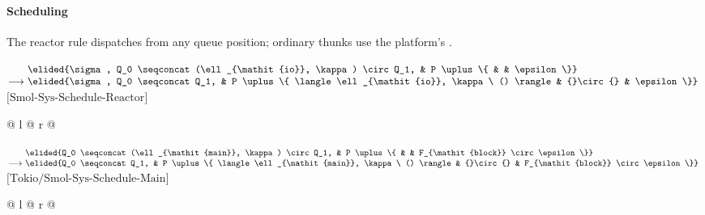 \paragraph{Scheduling}
The reactor rule dispatches from any queue position; ordinary thunks use the platform's  .

\noindent
$\begin{array}[t]{@{}r@{\ }l@{\ }l@{}l@{}l@{}}
                & \elided{\sigma, Q_0 \seqconcat (\ell_{\mathit{io}}, \kappa) \circ Q_1, & P \uplus \{ & & \epsilon \}} \\
\longrightarrow & \elided{\sigma, Q_0 \seqconcat Q_1, & P \uplus \{ \langle \ell_{\mathit{io}}, \kappa\ () \rangle & {}\circ{} & \epsilon \}}
\end{array}$\hfill$\text{[Smol-Sys-Schedule-Reactor]}$\par
\noindent
\begin{tabular*}{\linewidth}{@{} l @{\extracolsep{\fill}} r @{}}
\end{tabular*}

\vspace{1em}
\noindent
$\begin{array}[t]{@{}r@{\ }l@{\ }l@{}l@{}l@{}}
                & \elided{Q_0 \seqconcat (\ell_{\mathit{main}}, \kappa) \circ Q_1, & P \uplus \{ & & F_{\mathit{block}} \circ \epsilon \}} \\
\longrightarrow & \elided{Q_0 \seqconcat Q_1, & P \uplus \{ \langle \ell_{\mathit{main}}, \kappa\ () \rangle & {}\circ{} & F_{\mathit{block}} \circ \epsilon \}}
\end{array}$\hfill$\text{[Tokio/Smol-Sys-Schedule-Main]}$\par
\noindent
\begin{tabular*}{\linewidth}{@{} l @{\extracolsep{\fill}} r @{}}
\end{tabular*}

